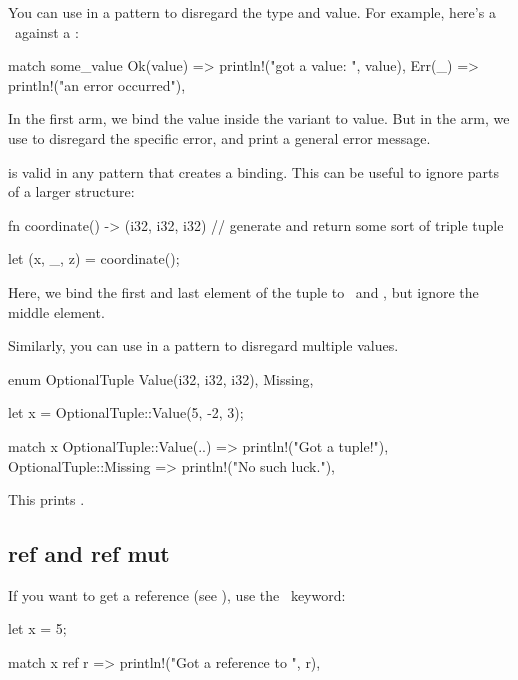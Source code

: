 You can use \code{\_} in a pattern to disregard the type and value. For example, here's a \match\ against a :

\begin{rustc}
match some_value {
    Ok(value) => println!("got a value: {}", value),
    Err(_) => println!("an error occurred"),
}
\end{rustc}

In the first arm, we bind the value inside the  variant to value. But in the  arm, we use \code{\_} to disregard 
the specific error, and print a general error message.

\blank

\code{\_} is valid in any pattern that creates a binding. This can be useful to ignore parts of a larger structure:

\begin{rustc}
fn coordinate() -> (i32, i32, i32) {
    // generate and return some sort of triple tuple
}

let (x, _, z) = coordinate();
\end{rustc}

Here, we bind the first and last element of the tuple to \x\ and \z, but ignore the middle element.

\blank

Similarly, you can use  in a pattern to disregard multiple values.

\begin{rustc}
enum OptionalTuple {
    Value(i32, i32, i32),
    Missing,
}

let x = OptionalTuple::Value(5, -2, 3);

match x {
    OptionalTuple::Value(..) => println!("Got a tuple!"),
    OptionalTuple::Missing => println!("No such luck."),
}
\end{rustc}

This prints .

\subsection*{ref and ref mut}

If you want to get a reference (see ), use the \keyref\ keyword:

\begin{rustc}
let x = 5;

match x {
    ref r => println!("Got a reference to {}", r),
}
\end{rustc}

